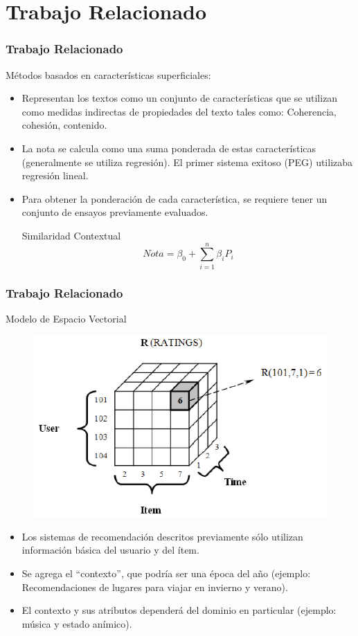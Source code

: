 \documentclass{beamer}
\begin{document}
\section{Trabajo Relacionado}
\begin{frame}
\frametitle{Trabajo Relacionado}
Métodos basados en características superficiales:

\begin{itemize}
\item Representan los textos como un conjunto de características que se utilizan como medidas indirectas de propiedades del texto tales como: Coherencia, cohesión, contenido.
\item La nota se calcula como una suma ponderada de estas características (generalmente se utiliza regresión). El primer sistema exitoso (PEG) utilizaba regresión lineal.
\item Para obtener la ponderación de cada característica, se requiere tener un conjunto de ensayos previamente evaluados.
\begin{block}{Similaridad Contextual}
\begin{equation}
	Nota = \beta_0 + \sum_{i=1}^n \beta_i P_i
\end{equation}
\end{block}


\end{itemize}

\end{frame}


\begingroup
\small
\begin{frame}
\frametitle{Trabajo Relacionado}
Modelo de Espacio Vectorial

\begin{figure}
\includegraphics[width=0.5\linewidth]{user_item_context.png}
\end{figure}

\begin{itemize}
\item Los sistemas de recomendación descritos previamente sólo utilizan información básica del usuario y del ítem.
\item Se agrega el ``contexto'', que podría ser una época del año (ejemplo: Recomendaciones de lugares para viajar en invierno y verano).
\item El contexto y sus atributos dependerá del dominio en particular (ejemplo: música y estado anímico).
\end{itemize}

\end{frame}
\endgroup
\end{document}
